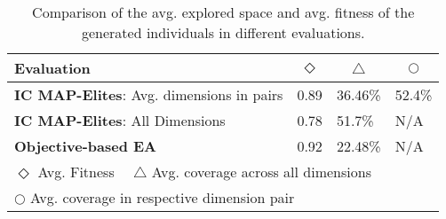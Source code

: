 \begin{table}[]
\caption{Comparison of the avg. explored space and avg. fitness of the generated individuals in different evaluations.}
\label{tab:evaluationTable}
\begin{tabular}{|l|lll|}
\hline
Evaluation & \multicolumn{1}{c|}{$\Diamond$} & \multicolumn{1}{c|}{$\bigtriangleup$} & \multicolumn{1}{c|}{$\bigcirc$} \\ \hline
\textbf{IC MAP-Elites}: Avg. dimensions in pairs & 0.89 & 36.46\% & 52.4\% \\ \hline
\textbf{IC MAP-Elites}: All Dimensions & 0.78 & 51.7\% & N/A      \\ \hline
\textbf{Objective-based EA}& 0.92 & 22.48\% & N/A      \\ \hline

\multicolumn{4}{l}{$\Diamond$ Avg. Fitness \ \
$\bigtriangleup$ Avg. coverage across all dimensions} \\ 
\multicolumn{4}{l}{$\bigcirc$ Avg. coverage in respective dimension pair}
\end{tabular}%
\end{table}